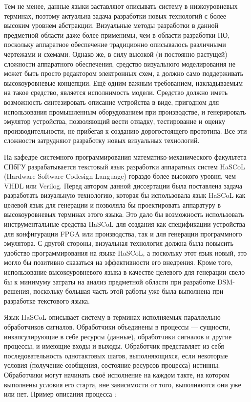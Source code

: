 Тем не менее, данные языки заставляют описывать систему в низкоуровневых терминах, 
поэтому актуальна задача разработки новых технологий с более высоким уровнем абстракции. 
Визуальные методы разработки в данной предметной области даже более применимы, чем 
в области разработки ПО, поскольку аппаратное обеспечение традиционно описывалось 
различными чертежами и схемами. Однако же, в силу высокой (и постоянно растущей) сложности 
аппаратного обеспечения, средство визуального моделирования не может быть просто редактором 
электронных схем, а должно само поддерживать высокоуровневые концепции. Ещё одним 
важным требованием, накладываемым на такое средство, является исполнимость модели. 
Средство должно иметь возможность синтезировать описание устройства в виде, пригодном 
для использования промышленным оборудованием при производстве, и генерировать эмулятор 
устройства, позволяющий вести отладку, тестирование и оценку производительности, не 
прибегая к созданию дорогостоящего прототипа. Все эти сложности затрудняют разработку 
новых визуальных технологий.

На кафедре системного программирования математико-механического факультета СПбГУ разрабатывается 
текстовый язык разработки аппаратных систем HaSCoL (Hardware-Software Codesign Language)
гораздо более высокого уровня, чем VHDL или Verilog. Перед автором данной диссертации 
была поставлена задача разработать визуальную технологию, которая бы использовала 
язык HaSCoL как целевой язык для генерации и позволяла бы проектировать аппаратуру 
в высокоуровневых терминах этого языка. Это дало бы возможность использовать инструментальные 
средства HaSCoL для создания как спецификации устройства для конфигурации FPGA
или производства, так и для генерации программного эмулятора. С другой стороны, визуальная 
технология должна была повысить удобство программирования на языке HaSCoL, а поскольку 
этот язык новый, это могло бы позитивно сказаться на эффективности его внедрения. 
Кроме того, использование высокоуровневого языка в качестве целевого для генерации 
свело бы к минимуму затраты на анализ предметной области при разработке DSM-решения, 
поскольку большая часть этой работы уже была выполнена при разработке текстового языка.

Язык HaSCoL описывает систему  в терминах исполняемых параллельно обработчиков сигналов.
Обработчики объединены в процессы --- сущности, инкапсулирующие в себе ресурсы (данные), 
обработчики сигналов и другие процессы, и имеющие входы и выходы. Обработчик представляет 
из себя последовательность однотактовых шагов, выполняющихся, если некоторые условия 
(получение сообщения, состояние ресурсов процесса) истинны. Обработчики могут начинать 
своё исполнение на каждом такте, на котором выполнены условия его старта, вне зависимости 
от того, выполняются они уже или нет. Пример описания процесса
:

